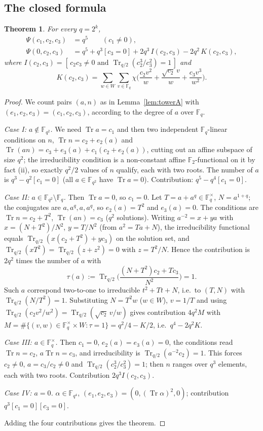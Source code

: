 \documentclass[11pt,a4paper]{amsart}
\newtheorem{theorem}{Theorem}[section]
\theoremstyle{definition}
\newcommand{\F}{\mathbb{F}}
\newcommand{\Tr}{\operatorname{Tr}}
\begin{document}
\subsection{The closed formula}
\begin{theorem}\label{thm:d4formula}
For every $q=2^k$,
\begin{align*}
\Psi(c_1,c_2,c_3)&=q^5\qquad(c_1\ne0),\\
\Psi(0,c_2,c_3)&=q^5+q^3[c_3=0]+2q^3\,I(c_2,c_3)-2q^2\,K(c_2,c_3),
\end{align*}
where $I(c_2,c_3)=[\,c_2c_3\ne0\text{ and }\Tr_{q/2}(c_2^3/c_3^2)=1\,]$ and
\[
K(c_2,c_3)=\sum_{w\in W}\sum_{v\in\F_q}\chi\Big(\frac{c_2v^2}{w}+\frac{\sqrt{c_2}\,v}{w}+\frac{c_3v^3}{w^2}\Big).
\]
\end{theorem}
\begin{proof}
We count pairs $(a,n)$ as in Lemma~\ref{lem:towerA} with $(e_1,e_2,e_3)=(c_1,c_2,c_3)$, according to the degree of $a$ over $\F_q$.

\emph{Case I: $a\notin\F_{q^2}$.} We need $\Tr a=c_1$ and then two independent $\F_q$-linear conditions on $n$, $\Tr n=c_2+e_2(a)$ and $\Tr(an)=c_3+e_3(a)+c_1(c_2+e_2(a))$, cutting out an affine subspace of size $q^2$; the irreducibility condition is a non-constant affine $\F_2$-functional on it by fact (ii), so exactly $q^2/2$ values of $n$ qualify, each with two roots. The number of $a$ is $q^3-q^2[c_1=0]$ (all $a\in\F_{q^2}$ have $\Tr a=0$). Contribution: $q^5-q^4[c_1=0]$.

\emph{Case II: $a\in\F_{q^2}\setminus\F_q$.} Then $\Tr a=0$, so $c_1=0$. Let $T=a+a^q\in\F_q^\times$, $N=a^{1+q}$; the conjugates are $a,a^q,a,a^q$, so $e_2(a)=T^2$ and $e_3(a)=0$. The conditions are $\Tr n=c_2+T^2$, $\Tr(an)=c_3$ ($q^2$ solutions). Writing $a^{-2}=x+ya$ with $x=(N+T^2)/N^2$, $y=T/N^2$ (from $a^2=Ta+N$), the irreducibility functional equals $\Tr_{q/2}(x(c_2+T^2)+yc_3)$ on the solution set, and $\Tr_{q/2}(xT^2)=\Tr_{q/2}(z+z^2)=0$ with $z=T^2/N$. Hence the contribution is $2q^2$ times the number of $a$ with
\[
\tau(a):=\Tr_{q/2}\Big(\frac{(N+T^2)c_2+Tc_3}{N^2}\Big)=1 .
\]
Such $a$ correspond two-to-one to irreducible $t^2+Tt+N$, i.e.\ to $(T,N)$ with $\Tr_{q/2}(N/T^2)=1$. Substituting $N=T^2w$ ($w\in W$), $v=1/T$ and using $\Tr_{q/2}(c_2v^2/w^2)=\Tr_{q/2}(\sqrt{c_2}\,v/w)$ gives contribution $4q^2M$ with $M=\#\{(v,w)\in\F_q^\times\times W:\tau=1\}=q^2/4-K/2$, i.e.\ $q^4-2q^2K$.

\emph{Case III: $a\in\F_q^\times$.} Then $c_1=0$, $e_2(a)=e_3(a)=0$, the conditions read $\Tr n=c_2$, $a\Tr n=c_3$, and irreducibility is $\Tr_{q/2}(a^{-2}c_2)=1$. This forces $c_2\ne0$, $a=c_3/c_2\ne0$ and $\Tr_{q/2}(c_2^3/c_3^2)=1$; then $n$ ranges over $q^3$ elements, each with two roots. Contribution $2q^3I(c_2,c_3)$.

\emph{Case IV: $a=0$.} $\alpha\in\F_{q^4}$, $(e_1,e_2,e_3)=(0,(\Tr\alpha)^2,0)$; contribution $q^3[c_1=0][c_3=0]$.

Adding the four contributions gives the theorem.
\end{proof}
\end{document}

